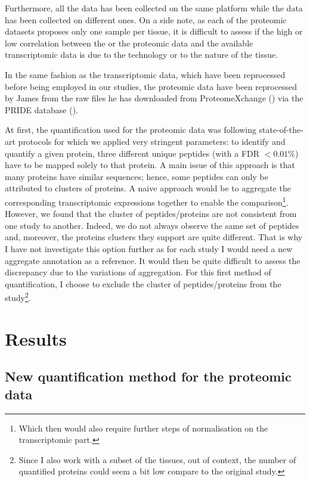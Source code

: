 Furthermore, all the  data has been
collected on the same platform while the  data has been
collected on different ones. On a side note, as each of the proteomic datasets
proposes only one sample per tissue, it is difficult to assess if the high or low
correlation between the  or the 
proteomic data and the available transcriptomic data is due to the technology or
to the nature of the tissue.


In the same fashion as the transcriptomic data, which have been reprocessed
before being employed in our studies, the proteomic data have been reprocessed
by James from the raw files he has downloaded from ProteomeXchange
(\cite{ProteomeXchange:2014}) via the PRIDE database (\cite{Pride:2016}).

At first, the quantification used for the proteomic data was following
state-of-the-art protocols for which we applied very stringent parameters:
to identify and quantify a given protein, three different unique peptides
(with a \gls{FDR} $< 0.01 \%$) have to be mapped solely to that protein. A main
issue of this approach is that many proteins have similar sequences; hence, some
peptides can only be attributed to clusters of proteins. A naive approach would
be to aggregate the corresponding transcriptomic expressions together to enable
the comparison\footnote{Which then would also require further steps of
normalisation on the transcriptomic part.}. However, we found that the cluster
of peptides/proteins are not consistent from one study to another. Indeed, we do
not always observe the same set of peptides and, moreover, the proteins clusters
they support are quite different. That is why I have not investigate this option
further as for each study I would need a new aggregate annotation as a reference.
It would then be quite difficult to assess the discrepancy due to the
variations of aggregation. For this first method of quantification, I choose to
exclude the cluster of peptides/proteins from the study\footnote{Since I also work
with a subset of the tissues, out of context, the number of quantified proteins
could seem a bit low compare to the original study.}.


\section{Results}
\label{sec:IntegrationResults}

\subsection{New quantification method for the proteomic data}
\label{subsec:IntegrationNewMethQuant}


